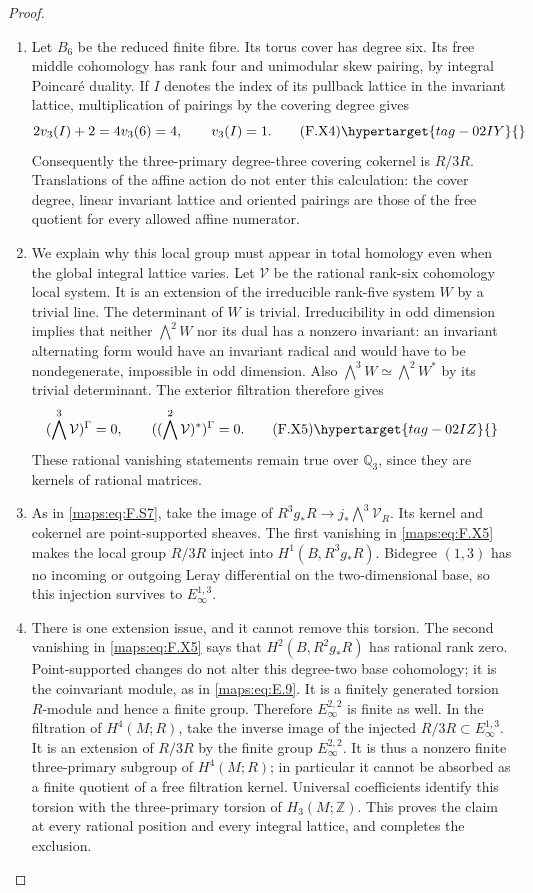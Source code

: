 \begin{proof}
\begin{enumerate}[label={$\langle1\rangle$\arabic*.}]
\item Let $B_6$ be the reduced finite fibre.  Its torus
cover has degree six.  Its free middle cohomology has
rank four and unimodular skew pairing, by integral
Poincar\'e duality.  If $I$ denotes the index of its
pullback lattice in the invariant lattice, multiplication
of pairings by the covering degree gives
\[
 2v_3(I)+2=4v_3(6)=4,
 \qquad v_3(I)=1.
 \tag{F.X4}\hypertarget{tag-02IY}{}\label{maps:eq:F.X4}
\]
Consequently the three-primary degree-three covering
cokernel is $R/3R$.  Translations of the affine action
do not enter this calculation: the cover degree,
linear invariant lattice and oriented pairings are
those of the free quotient for every allowed
affine numerator.

\item We explain why this local group must appear in total
homology even when the global integral lattice varies.
Let $\mathcal V$ be the rational rank-six cohomology
local system.  It is an extension of the irreducible
rank-five system $W$ by a trivial line.  The determinant
of $W$ is trivial.  Irreducibility in odd dimension
implies that neither $\bigwedge^2 W$ nor its dual
has a nonzero invariant: an invariant alternating
form would have an invariant radical and would have
to be nondegenerate, impossible in odd dimension.
Also $\bigwedge^3W\simeq\bigwedge^2W^*$ by its
trivial determinant.  The exterior filtration therefore
gives
\[
 (\bigwedge^3\mathcal V)^\Gamma=0,\qquad
 ((\bigwedge^2\mathcal V)^*)^\Gamma=0.
 \tag{F.X5}\hypertarget{tag-02IZ}{}\label{maps:eq:F.X5}
\]
These rational vanishing statements remain true over
$\mathbb Q_3$, since they are kernels of rational
matrices.

\item As in \eqref{maps:eq:F.S7}, take the image of
$R^3g_*R\to j_*\bigwedge^3\mathcal V_R$.
Its kernel and cokernel are point-supported sheaves.
The first vanishing in \eqref{maps:eq:F.X5} makes the local group
$R/3R$ inject into $H^1(B,R^3g_*R)$.  Bidegree $(1,3)$
has no incoming or outgoing Leray differential on
the two-dimensional base, so this injection survives
to $E_\infty^{1,3}$.

\item There is one extension issue, and it cannot remove
this torsion.  The second vanishing in \eqref{maps:eq:F.X5} says
that $H^2(B,R^2g_*R)$ has rational rank zero.
Point-supported changes do not alter this degree-two
base cohomology; it is the coinvariant module, as
in \eqref{maps:eq:E.9}.  It is a finitely generated torsion $R$-module
and hence a finite group.  Therefore
$E_\infty^{2,2}$ is finite as well.  In the filtration
of $H^4(M;R)$, take the inverse image of the injected
$R/3R\subset E_\infty^{1,3}$.  It is an extension
of $R/3R$ by the finite group $E_\infty^{2,2}$.
It is thus a nonzero finite three-primary subgroup
of $H^4(M;R)$; in particular it cannot be absorbed
as a finite quotient of a free filtration kernel.
Universal coefficients identify this torsion with
the three-primary torsion of $H_3(M;\mathbb Z)$.
This proves the claim at every rational position and
every integral lattice, and completes the exclusion.


\end{enumerate}
\end{proof}
